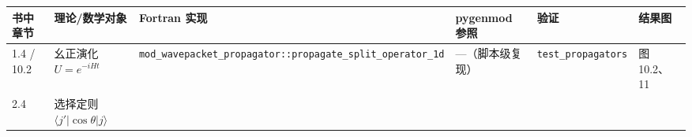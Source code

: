 \documentclass[
]{ctexbook}
\begin{document}
\begin{longtable}[]{@{}llllll@{}}
\toprule
\begin{minipage}[b]{0.14\columnwidth}\raggedright
书中章节\strut
\end{minipage} & \begin{minipage}[b]{0.14\columnwidth}\raggedright
理论/数学对象\strut
\end{minipage} & \begin{minipage}[b]{0.14\columnwidth}\raggedright
Fortran 实现\strut
\end{minipage} & \begin{minipage}[b]{0.14\columnwidth}\raggedright
pygenmod 参照\strut
\end{minipage} & \begin{minipage}[b]{0.14\columnwidth}\raggedright
验证\strut
\end{minipage} & \begin{minipage}[b]{0.14\columnwidth}\raggedright
结果图\strut
\end{minipage}\tabularnewline
\midrule
\endhead
\begin{minipage}[t]{0.14\columnwidth}\raggedright
1.4 / 10.2\strut
\end{minipage} & \begin{minipage}[t]{0.14\columnwidth}\raggedright
幺正演化 \(U=e^{-iHt}\)\strut
\end{minipage} & \begin{minipage}[t]{0.14\columnwidth}\raggedright
\texttt{mod\_wavepacket\_propagator::propagate\_split\_operator\_1d}\strut
\end{minipage} & \begin{minipage}[t]{0.14\columnwidth}\raggedright
---（脚本级复现）\strut
\end{minipage} & \begin{minipage}[t]{0.14\columnwidth}\raggedright
\texttt{test\_propagators}\strut
\end{minipage} & \begin{minipage}[t]{0.14\columnwidth}\raggedright
图 10.2、11\strut
\end{minipage}\tabularnewline
\begin{minipage}[t]{0.14\columnwidth}\raggedright
2.4\strut
\end{minipage} & \begin{minipage}[t]{0.14\columnwidth}\raggedright
选择定则 \(\langle j'|\cos\theta|j\rangle\)\strut
\end{minipage} & \begin{minipage}[t]{0.14\columnwidth}\raggedright

\end{minipage}
\end{longtable}
\end{document}
